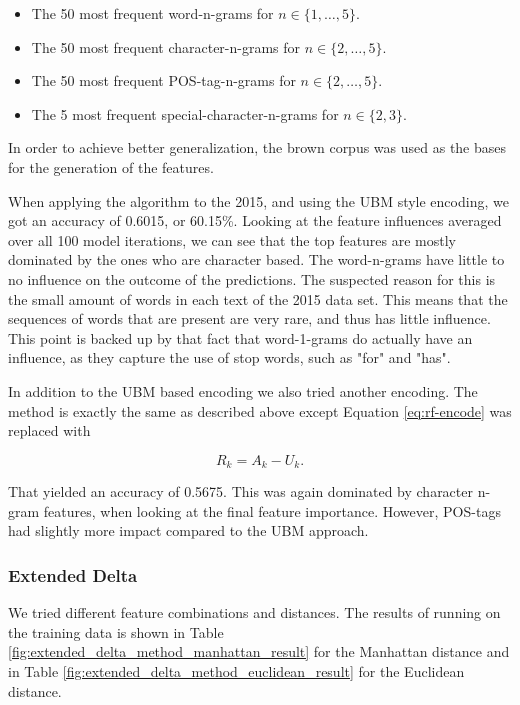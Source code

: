 \begin{itemize}
    \item The 50 most frequent word-n-grams for $n \in \{1, \dots, 5\}$.
    \item The 50 most frequent character-n-grams for $n \in \{2, \dots, 5\}$.
    \item The 50 most frequent \gls{POS}-tag-n-grams for $n \in \{2, \dots, 5\}$.
    \item The 5 most frequent special-character-n-grams for $n \in \{2, 3\}$.
\end{itemize}

In order to achieve better generalization, the brown corpus was used as the
bases for the generation of the features.

When applying the algorithm to the 2015, and using the \gls{UBM} style encoding,
we got an accuracy of 0.6015, or 60.15\%. Looking at the feature influences
averaged over all 100 model iterations, we can see that the top features are
mostly dominated by the ones who are character based. The word-n-grams
have little to no influence on the outcome of the predictions. The suspected
reason for this is the small amount of words in each text of the 2015 data set.
This means that the sequences of words that are present are very rare, and thus
has little influence. This point is backed up by that fact that word-1-grams
do actually have an influence, as they capture the use of stop words, such as
"for" and "has".

In addition to the \gls{UBM} based encoding we also tried another encoding. The
method is exactly the same as described above except Equation
\eqref{eq:rf-encode} was replaced with

\begin{equation}
    R_k = A_k - U_k.
\end{equation}

That yielded an accuracy of 0.5675. This was again dominated by character n-gram
features, when looking at the final feature importance. However, \gls{POS}-tags
had slightly more impact compared to the \gls{UBM} approach.

\subsubsection{Extended Delta} \label{subsubsec:method:extended_delta}
We tried different feature combinations and distances. The
results of running on the training data is shown in Table
\ref{fig:extended_delta_method_manhattan_result} for the Manhattan distance and
in Table \ref{fig:extended_delta_method_euclidean_result} for the Euclidean
distance.

